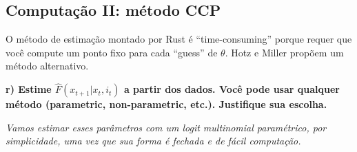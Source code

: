 \documentclass[12pt,a4paper]{article}
\begin{document}
\hypertarget{computacao-ii-metodo-ccp}{%
\subsection{Computação II: método CCP}\label{computacao-ii-metodo-ccp}}

O método de estimação montado por Rust é ``time-consuming'' porque
requer que você compute um ponto fixo para cada ``guess'' de \(\theta\).
Hotz e Miller propõem um método alternativo.

\textbf{r) Estime \(\hat{F}(x_{t+1}|x_t,i_t)\) a partir dos dados. Você
pode usar qualquer método (parametric, non-parametric, etc.). Justifique
sua escolha.}

\emph{Vamos estimar esses parâmetros com um logit multinomial
paramétrico, por simplicidade, uma vez que sua forma é fechada e de
fácil computação.}
\end{document}
